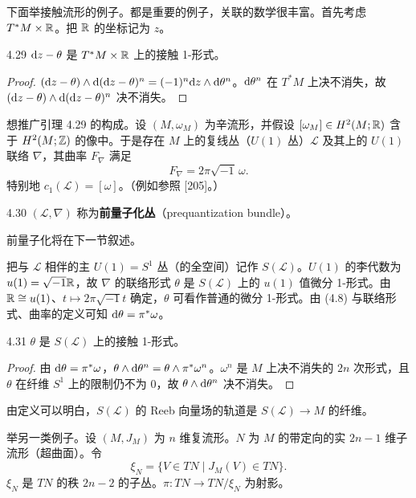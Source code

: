 下面举接触流形的例子。都是重要的例子，关联的数学很丰富。首先考虑 $T^*M\times\mathbb{R}$。把 $\mathbb{R}$ 的坐标记为 $z$。

\begin{lemma*}{4.29}
  $\mathrm{d} z-\theta$ 是 $T^*M\times\mathbb{R}$ 上的接触 1-形式。
\end{lemma*}
\begin{proof}
  $(\mathrm{d} z-\theta)\wedge\mathrm{d}(\mathrm{d} z-\theta)^n=(-1)^n\mathrm{d} z\wedge\mathrm{d}\theta^n$。$\mathrm{d}\theta^n$ 在 $T^*M$ 上决不消失，故 $(\mathrm{d} z-\theta)\wedge\mathrm{d}(\mathrm{d} z-\theta)^n$ 决不消失。
\end{proof}

想推广引理 4.29 的构成。设 $(M,\omega_M)$ 为辛流形，并假设 $[\omega_M]\in H^2(M;\mathbb{R})$ 含于 $H^2(M;\mathbb{Z})$ 的像中。于是存在 $M$ 上的复线丛（$U(1)$ 丛）$\mathcal L$ 及其上的 $U(1)$ 联络 $\nabla$，其曲率 $F_\nabla$ 满足
\begin{equation}
  F_\nabla=2\pi\sqrt{-1}\,\omega. \tag{4.8}
\end{equation}
特别地 $c_1(\mathcal L)=[\omega]$。（例如参照 [205]。）

\begin{definition}{4.30}
  $(\mathcal L,\nabla)$ 称为\textbf{前量子化丛}（prequantization bundle）。
\end{definition}

前量子化将在下一节叙述。

把与 $\mathcal L$ 相伴的主 $U(1)=S^1$ 丛（的全空间）记作 $S(\mathcal L)$。$U(1)$ 的李代数为 $u(1)=\sqrt{-1}\mathbb{R}$，故 $\nabla$ 的联络形式 $\theta$ 是 $S(\mathcal L)$ 上的 $u(1)$ 值微分 1-形式。由 $\mathbb{R}\cong u(1)$、$t\mapsto2\pi\sqrt{-1}t$ 确定，$\theta$ 可看作普通的微分 1-形式。由 (4.8) 与联络形式、曲率的定义可知 $\mathrm{d}\theta=\pi^*\omega$。

\begin{lemma*}{4.31}
  $\theta$ 是 $S(\mathcal L)$ 上的接触 1-形式。
\end{lemma*}
\begin{proof}
  由 $\mathrm{d}\theta=\pi^*\omega$，$\theta\wedge\mathrm{d}\theta^n=\theta\wedge\pi^*\omega^n$。$\omega^n$ 是 $M$ 上决不消失的 $2n$ 次形式，且 $\theta$ 在纤维 $S^1$ 上的限制仍不为 $0$，故 $\theta\wedge\mathrm{d}\theta^n$ 决不消失。
\end{proof}

由定义可以明白，$S(\mathcal L)$ 的 Reeb 向量场的轨道是 $S(\mathcal L)\to M$
的纤维。

举另一类例子。设 $(M,J_M)$ 为 $n$ 维复流形。$N$ 为 $M$ 的带定向的实 $2n-1$ 维子流形（超曲面）。令
\begin{equation}
  \xi_N=\{V\in TN\mid J_M(V)\in TN\}. \tag{4.9}
\end{equation}
$\xi_N$ 是 $TN$ 的秩 $2n-2$ 的子丛。$\pi:TN\to TN/\xi_N$ 为射影。

